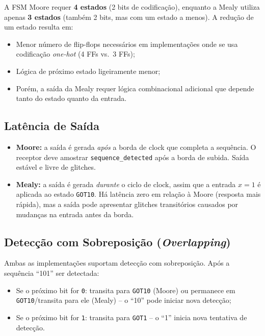 \documentclass[12pt,a4paper]{article}
\begin{document}
A FSM Moore requer \textbf{4 estados} (2 bits de codificação), enquanto a Mealy
utiliza apenas \textbf{3 estados} (também 2 bits, mas com um estado a menos).
A redução de um estado resulta em:
\begin{itemize}[leftmargin=1.5cm]
  \item Menor número de flip-flops necessários em implementações onde se usa
        codificação \textit{one-hot} (4 FFs vs.\ 3 FFs);
  \item Lógica de próximo estado ligeiramente menor;
  \item Porém, a saída da Mealy requer lógica combinacional adicional que depende
        tanto do estado quanto da entrada.
\end{itemize}

\subsection{Latência de Saída}

\begin{destaquebox}
  \begin{itemize}
    \item \textbf{Moore:} a saída é gerada \emph{após} a borda de clock que completa
          a sequência. O receptor deve amostrar \texttt{sequence\_detected} após a
          borda de subida. Saída estável e livre de glitches.
    \item \textbf{Mealy:} a saída é gerada \emph{durante} o ciclo de clock, assim
          que a entrada $x=1$ é aplicada ao estado \texttt{GOT10}. Há latência
          zero em relação à Moore (resposta mais rápida), mas a saída pode apresentar
          glitches transitórios causados por mudanças na entrada antes da borda.
  \end{itemize}
\end{destaquebox}

\subsection{Detecção com Sobreposição (\textit{Overlapping})}

Ambas as implementações suportam detecção com sobreposição. Após a sequência
``101'' ser detectada:
\begin{itemize}[leftmargin=1.5cm]
  \item Se o próximo bit for \texttt{0}: transita para \texttt{GOT10} (Moore) ou
        permanece em \texttt{GOT10}/transita para ele (Mealy) -- o ``10'' pode
        iniciar nova detecção;
  \item Se o próximo bit for \texttt{1}: transita para \texttt{GOT1} -- o ``1''
        inicia nova tentativa de detecção.
\end{itemize}
\end{document}
